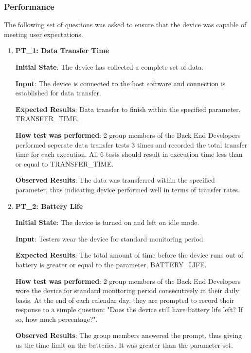 \documentclass[12pt, titlepage]{article}
\begin{document}
\subsubsection{Performance}
The following set of questions was asked to ensure that the device was capable of meeting user expectations.
\begin{enumerate}
  \item\textbf{{PT\_1: Data Transfer Time\\}}\label{PT1}

  \textbf{Initial State}: The device has collected a complete set of data.

  \textbf{Input}: The device is connected to the host software and connection is established for data transfer.

  \textbf{Expected Results}: Data transfer to finish within the specified parameter, TRANSFER\_TIME.

  \textbf{How test was performed}: 2 group members of the Back End Developers performed seperate data transfer tests 3 times and recorded the total transfer time for each execution. All 6 tests should result in execution time less than or equal to TRANSFER\_TIME.

  \textbf{Observed Results}: The data was transferred within the specified parameter, thus indicating device performed well in terms of transfer rates.

  \item\textbf{{PT\_2: Battery Life\\}}\label{PT2}

  \textbf{Initial State}: The device is turned on and left on idle mode.

  \textbf{Input}: Testers wear the device for standard monitoring period.

  \textbf{Expected Results}: The total amount of time before the device runs out of battery is greater or equal to the parameter, BATTERY\_LIFE.

  \textbf{How test was performed}: 2 group members of the Back End Developers wore the device for standard monitoring period consecutively in their daily basis. At the end of each calendar day, they are prompted to record their response to a simple question: "Does the device still have battery life left? If so, how much percentage?".

  \textbf{Observed Results}: The group members answered the prompt, thus giving us the time limit on the batteries. It was greater than the parameter set.

\end{enumerate}
\end{document}
